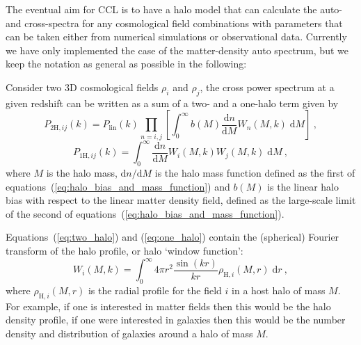 \documentclass[\docopts]{\docclass}
\begin{document}
The eventual aim for CCL is to have a halo model that can calculate the auto- and cross-spectra for any cosmological field combinations with parameters that can be taken either from numerical simulations or observational data. Currently we have only implemented the case of the matter-density auto spectrum, but we keep the notation as general as possible in the following:

Consider two 3D cosmological fields $\rho_i$ and $\rho_j$, the cross power spectrum at a given redshift can be written as a sum of a two- and a one-halo term given by
\begin{equation}
P_{2\mathrm{H},ij}(k)=P_{\mathrm{lin}}(k)
\prod_{n=i,j}\left[\int_0^\infty b(M)\frac{\mathrm{d}n}{\mathrm{d}M}W_n(M,k)\;\mathrm{d}M\right]\ ,
\label{eq:two_halo}
\end{equation}
\begin{equation}
P_{1\mathrm{H},ij}(k)=\int_0^\infty \frac{\mathrm{d}n}{\mathrm{d}M}W_i(M,k)W_j(M,k)\;\mathrm{d}M\ ,
\label{eq:one_halo}
\end{equation}
where $M$ is the halo mass, $\mathrm{d}n/\mathrm{d}M$ is the halo mass function defined as the first of equations~(\ref{eq:halo_bias_and_mass_function}) and $b(M)$ is the linear halo bias with respect to the linear matter density field, defined as the large-scale limit of the second of equations~(\ref{eq:halo_bias_and_mass_function}).

Equations~(\ref{eq:two_halo}) and (\ref{eq:one_halo}) contain the (spherical) Fourier transform of the halo profile, or halo `window function':
\begin{equation}
W_i(M,k)=\int_0^\infty4\pi r^2\frac{\sin(kr)}{kr}\rho_{\mathrm{H},i}(M,r)\;\mathrm{d}r\ ,
\label{eq:window_function}
\end{equation}
where $\rho_{\mathrm{H},i}(M,r)$ is the radial profile for the field $i$ in a host halo of mass $M$. For example, if one is interested in matter fields then this would be the halo density profile, if one were interested in galaxies then this would be the number density and distribution of galaxies around a halo of mass $M$.
\end{document}
